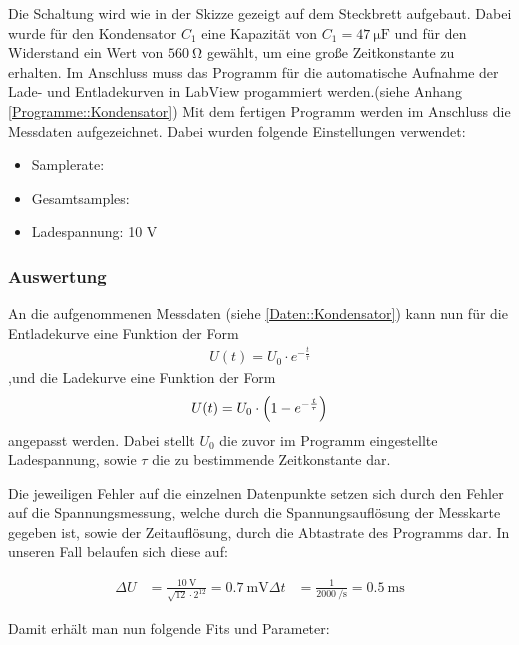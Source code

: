 \documentclass[12pt,twoside,a4paper]{scrartcl}
\begin{document}
				Die Schaltung wird wie in der Skizze gezeigt auf dem Steckbrett aufgebaut. Dabei wurde für den Kondensator $C_1$ eine Kapazität von $C_1 = \SI{47}{\micro \farad}$ und für den Widerstand ein Wert von $\SI{560}{\ohm}$ gewählt, um eine große Zeitkonstante zu erhalten. Im Anschluss muss das Programm für die automatische Aufnahme der Lade- und Entladekurven in LabView progammiert werden.(siehe Anhang \ref{Programme::Kondensator}) Mit dem fertigen Programm werden im Anschluss die Messdaten aufgezeichnet. Dabei wurden folgende Einstellungen verwendet:

				\begin{itemize}
					\item Samplerate:
					\item Gesamtsamples:
					\item Ladespannung: 10 V
				\end{itemize}

			\subsubsection{Auswertung}

				An die aufgenommenen Messdaten (siehe \ref{Daten::Kondensator}) kann nun für die Entladekurve eine Funktion der Form
				\begin{align*}
					U(t) = U_0 \cdot e^{-\frac{t}{\tau}}
				\end{align*}
				,und die Ladekurve eine Funktion der Form
				\begin{align*}
					U(t) = U_0 \cdot \qty(1-e^{-\frac{t}{\tau}})
				\end{align*}
				angepasst werden. Dabei stellt $U_0$ die zuvor im Programm eingestellte Ladespannung, sowie $\tau$ die zu bestimmende Zeitkonstante dar.

				Die jeweiligen Fehler auf die einzelnen Datenpunkte setzen sich durch den Fehler auf die Spannungsmessung, welche durch die Spannungsauflösung der Messkarte gegeben ist, sowie der Zeitauflösung, durch die Abtastrate des Programms dar. In unseren Fall belaufen sich diese auf:

				\begin{align}
					\label{Kondensator::Messfehler}
					\Delta U &= \frac{\SI{10}{\volt}}{\sqrt{12} \cdot 2^{12}} = \SI{0.7}{\milli \volt}
					\Delta t &= \frac{1}{\SI{2000}{\per \second}} =  \SI{0.5}{\milli \second} %
				\end{align}

				Damit erhält man nun folgende Fits und Parameter:
\end{document}
